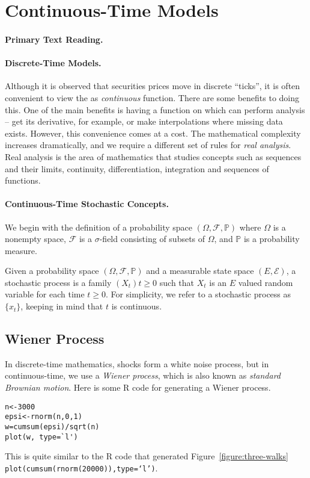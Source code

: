 \section{Continuous-Time Models}
\paragraph{Primary Text Reading.} 

\paragraph{Discrete-Time Models.} Although it is observed that securities prices move in discrete ``ticks'', it is often convenient to view the \fts{} as \emph{continuous} function. There are some benefits to doing this. One of the main benefits is having a function on which can perform analysis -- get its derivative, for example, or make interpolations where missing data exists. However, this convenience comes at a cost. The mathematical complexity increases dramatically, and we require a different set of rules for \emph{real analysis}. Real analysis is the area of mathematics that studies concepts such as sequences and their limits, continuity, differentiation, integration and sequences of functions. 

\paragraph{Continuous-Time Stochastic Concepts.} We begin with the definition of a probability space $(\Omega, \mathcal{F}, \mathbb{P})$ where $\Omega$ is a nonempty space, $\mathcal{F}$ is a $\sigma$-field consisting of subsets of $\Omega$, and $\mathbb{P}$ is a probability measure.

Given a probability space $(\Omega, \mathcal{F}, \mathbb{P})$ and a measurable state space $(E, \mathcal{E})$, a stochastic process is a family $(X_t)t \geq 0$ such that $X_t$ is an $E$ valued random variable for each time
$t \geq 0$. For simplicity, we refer to a stochastic process as $\{x_t\}$, keeping in mind that $t$ is continuous.

\subsection{Wiener Process}
In discrete-time mathematics, shocks form a white noise process, but in continuous-time, we use a \emph{Wiener process}, which is also known as \emph{standard Brownian motion}. Here is some R code for generating a Wiener process.
\begin{verbatim}
n<-3000
epsi<-rnorm(n,0,1)
w=cumsum(epsi)/sqrt(n)
plot(w, type=`l')
\end{verbatim}
This is quite similar to the R code that generated Figure~\ref{figure:three-walks} \\ \texttt{plot(cumsum(rnorm(20000)),type=`l')}.

